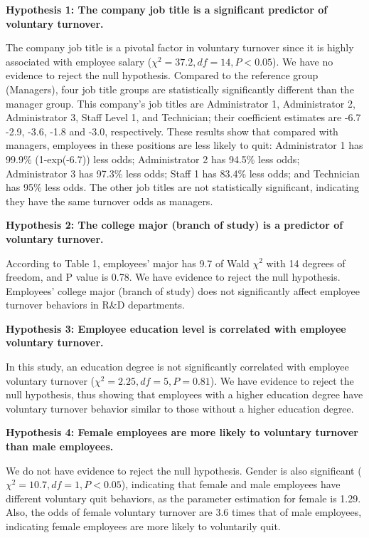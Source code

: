 \textbf{Hypothesis 1: The company job title is a significant predictor of voluntary turnover.}

The company job title is a pivotal factor in voluntary turnover since it is highly associated with employee salary ($\chi^2=37.2, df=14, P<0.05$). We have no evidence to reject the null hypothesis. Compared to the reference group (Managers), four job title groups are statistically significantly different than the manager group. This company’s job titles are Administrator 1, Administrator 2, Administrator 3, Staff Level 1, and Technician; their coefficient estimates are -6.7 -2.9, -3.6, -1.8 and -3.0, respectively. These results show that compared with managers, employees in these positions are less likely to quit: Administrator 1 has 99.9\% (1-exp(-6.7)) less odds; Administrator 2 has 94.5\% less odds; Administrator 3 has 97.3\% less odds; Staff 1 has 83.4\% less odds; and Technician has 95\% less odds. The other job titles are not statistically significant, indicating they have the same turnover odds as managers.

\textbf{Hypothesis 2: The college major (branch of study) is a predictor of voluntary turnover. }

According to Table 1, employees’ major has 9.7 of Wald $\chi^2$ with 14 degrees of freedom, and P value is 0.78. We have evidence to reject the null hypothesis. Employees’ college major (branch of study) does not significantly affect employee turnover behaviors in R\&D departments. 

\textbf{Hypothesis 3: Employee education level is correlated with employee voluntary turnover.}

In this study, an education degree is not significantly correlated with employee voluntary turnover ($\chi^2=2.25, df=5, P=0.81$). We have evidence to reject the null hypothesis, thus showing that employees with a higher education degree have voluntary turnover behavior similar to those without a higher education degree. 

\textbf{Hypothesis 4: Female employees are more likely to voluntary turnover than male employees. }

We do not have evidence to reject the null hypothesis. Gender is also significant ($\chi^2=10.7, df=1, P<0.05$), indicating that female and male employees have different voluntary quit behaviors, as the parameter estimation for female is 1.29. Also, the odds of female voluntary turnover are 3.6 times that of male employees, indicating female employees are more likely to voluntarily quit. 

